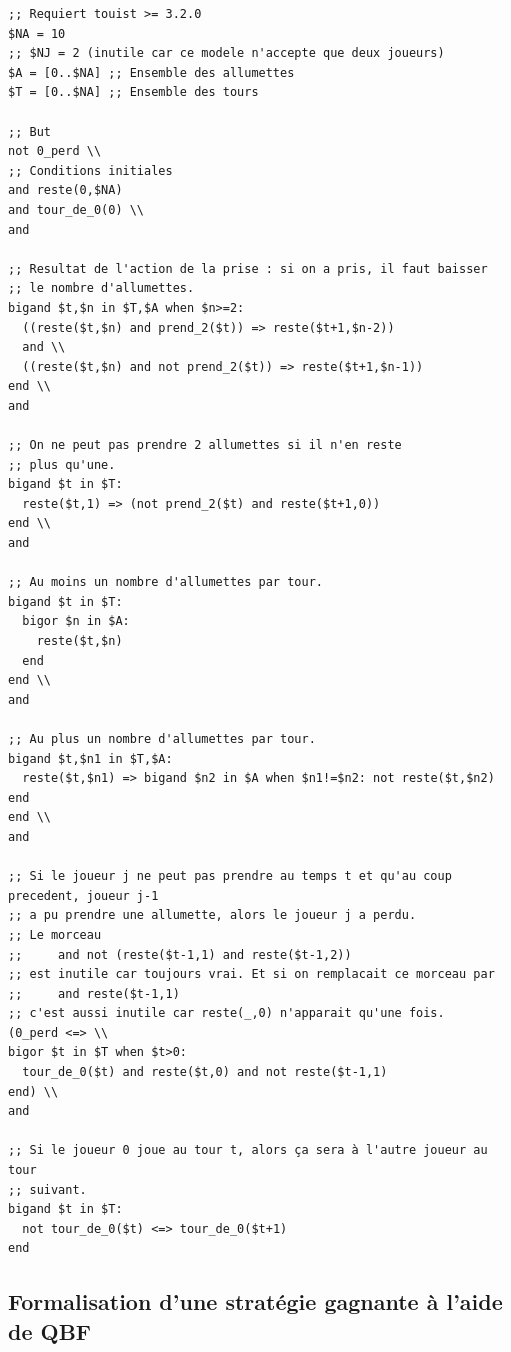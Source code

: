 \begin{lstlisting}[language=touist,frame=single]
;; Requiert touist >= 3.2.0
$NA = 10
;; $NJ = 2 (inutile car ce modele n'accepte que deux joueurs)
$A = [0..$NA] ;; Ensemble des allumettes
$T = [0..$NA] ;; Ensemble des tours

;; But
not 0_perd \\
;; Conditions initiales
and reste(0,$NA)
and tour_de_0(0) \\
and

;; Resultat de l'action de la prise : si on a pris, il faut baisser
;; le nombre d'allumettes.
bigand $t,$n in $T,$A when $n>=2:
  ((reste($t,$n) and prend_2($t)) => reste($t+1,$n-2))
  and \\
  ((reste($t,$n) and not prend_2($t)) => reste($t+1,$n-1))
end \\
and

;; On ne peut pas prendre 2 allumettes si il n'en reste
;; plus qu'une.
bigand $t in $T:
  reste($t,1) => (not prend_2($t) and reste($t+1,0))
end \\
and

;; Au moins un nombre d'allumettes par tour.
bigand $t in $T:
  bigor $n in $A:
    reste($t,$n)
  end
end \\
and

;; Au plus un nombre d'allumettes par tour.
bigand $t,$n1 in $T,$A:
  reste($t,$n1) => bigand $n2 in $A when $n1!=$n2: not reste($t,$n2) end
end \\
and

;; Si le joueur j ne peut pas prendre au temps t et qu'au coup precedent, joueur j-1
;; a pu prendre une allumette, alors le joueur j a perdu.
;; Le morceau
;;     and not (reste($t-1,1) and reste($t-1,2))
;; est inutile car toujours vrai. Et si on remplacait ce morceau par
;;     and reste($t-1,1)
;; c'est aussi inutile car reste(_,0) n'apparait qu'une fois.
(0_perd <=> \\
bigor $t in $T when $t>0:
  tour_de_0($t) and reste($t,0) and not reste($t-1,1)
end) \\
and

;; Si le joueur 0 joue au tour t, alors ça sera à l'autre joueur au tour
;; suivant.
bigand $t in $T:
  not tour_de_0($t) <=> tour_de_0($t+1)
end
\end{lstlisting}

\subsection{Formalisation d'une stratégie gagnante à l'aide de QBF}

